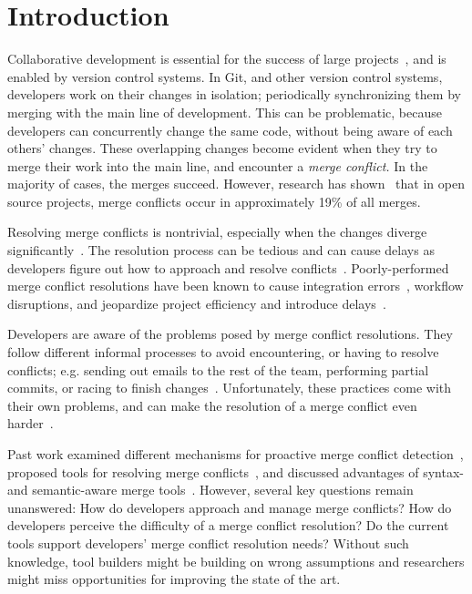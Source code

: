 
\section{Introduction}\label{introduction}

Collaborative development is essential for the success of large projects~\cite{hattori2010syde}, and is enabled by version control systems. 
In Git, and other version control systems, developers work on their changes in isolation; periodically synchronizing them by merging with the main line of development. 
This can be problematic, because developers can concurrently change the same code, without being aware of each others' changes.
These overlapping changes become evident when they try to merge their work into the main line, and encounter a \emph{merge conflict.}
In the majority of cases, the merges succeed.
However, research has shown~\cite{cassandra,Brun2011} that in open source projects, merge conflicts occur in approximately 19\% of all merges.

Resolving merge conflicts is nontrivial, especially when the changes diverge significantly~\cite{Brun2011}.
The resolution process can be tedious and can cause delays as developers figure out how to approach and resolve conflicts~\cite{cassandra}. 
Poorly-performed merge conflict resolutions have been known to cause integration errors~\cite{bird-branches-conflict}, workflow disruptions, and jeopardize project efficiency and introduce delays~\cite{estler2014awareness}. 

Developers are aware of the problems posed by merge conflict resolutions.
They follow different informal processes to avoid encountering, or having to resolve conflicts; e.g. sending out emails to the rest of the team, performing partial commits, or racing to finish changes~\cite{deSouza2003breaking,cataldo2008distributed_dev}.
Unfortunately, these practices come with their own problems, and can make the resolution of a merge conflict even harder~\cite{Brun2011}. 

Past work examined different mechanisms for proactive merge conflict detection~\cite{Brun2011,palantir,Guimaraes}, proposed tools for resolving merge conflicts~\cite{nishimura,mens2002state}, and discussed advantages of syntax- and semantic-aware merge tools~\cite{danny_refactorings,hunt2002extensible,apel_semistructured_2011}. 
However, several key questions remain unanswered: 
How do developers approach and manage merge conflicts?
How do developers perceive the difficulty of a merge conflict resolution? 
Do the current tools support developers' merge conflict resolution needs?
Without such knowledge, tool builders might be building on wrong assumptions and researchers might miss opportunities for improving the state of the art.

